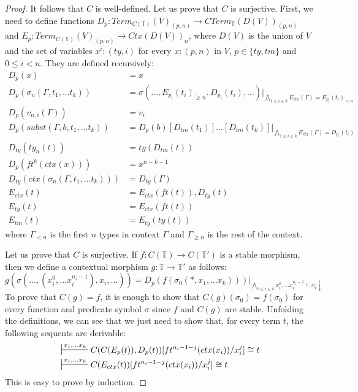 \documentclass[reqno]{amsart}
\theoremstyle{definition}
\theoremstyle{remark}
\newcommand{\emptyCtx}{*}
\numberwithin{figure}{section}
\begin{document}
\begin{proof}
It follows that $C$ is well-defined.
Let us prove that $C$ is surjective.
First, we need to define functions $D_p : Term_{C(\mathbb{T})}(V)_{(p,n)} \to CTerm_\mathbb{T}(D(V))_{(p,n)}$ and $E_p : Term_{C(\mathbb{T})}(V)_{(p,n)} \to Ctx(D(V))_n$,
where $D(V)$ is the union of $V$ and the set of variables $x^i : (ty,i)$ for every $x : (p,n)$ in $V$, $p \in \{ty,tm\}$ and $0 \leq i < n$.
They are defined recursively:
\begin{align*}
D_p(x) & = x \\
D_p(\sigma_n(\Gamma, t_1, \ldots t_k)) & = \sigma(\ldots, E_{p_i}(t_i)_{\geq n}.\,D_{p_i}(t_i), \ldots)|_{\bigwedge_{1 \leq i \leq k} E_{ctx}(\Gamma) = E_{p_i}(t_i)_{<n}} \\
D_p(v_{n,i}(\Gamma)) & = v_i \\
D_p(subst(\Gamma, b, t_1, \ldots t_k)) & = D_p(b)[D_{tm}(t_1)] \ldots [D_{tm}(t_k)]|_{\bigwedge_{1 \leq i \leq k} E_{ctx}(\Gamma) = D_{p_i}(t_i)} \\
D_{ty}(ty_n(t)) & = ty(D_{tm}(t)) \\
D_p(ft^k(ctx(x))) & = x^{n-k-1} \\
D_{ty}(ctx(\sigma_n(\Gamma, t_1, \ldots t_k))) & = D_{ty}(\Gamma) \\
E_{ctx}(t) & = E_{ctx}(ft(t)), D_{ty}(t) \\
E_{ty}(t) & = E_{ctx}(ft(t)) \\
E_{tm}(t) & = E_{ty}(ty(t))
\end{align*}
where $\Gamma_{<n}$ is the first $n$ types in context $\Gamma$ and $\Gamma_{\geq n}$ is the rest of the context.

Let us prove that $C$ is surjective.
If $f : C(\mathbb{T}) \to C(\mathbb{T}')$ is a stable morphism, then we define a contextual morphism $g : \mathbb{T} \to \mathbb{T}'$ as follows:
\[ g(\sigma(\ldots, (x_i^0, \ldots x_i^{n_i-1}).\,x_i, \ldots)) = D_p(f(\sigma_0(\emptyCtx, x_1, \ldots x_k)))|_{\bigwedge_{1 \leq i \leq k} x_i^0, \ldots x_i^{n_i-1} \vdash x_i \downarrow} \]
To prove that $C(g) = f$, it is enough to show that $C(g)(\sigma_0) = f(\sigma_0)$ for every function and predicate symbol $\sigma$ since $f$ and $C(g)$ are stable.
Unfolding the definitions, we can see that we just need to show that, for every term $t$, the following sequents are derivable:
\begin{align*}
& \sststile{}{x_1, \ldots x_k} C(C(E_p(t)), D_p(t))[ft^{n_i-1-j}(ctx(x_i))/x_i^j] \cong t \\
& \sststile{}{x_1, \ldots x_k} C(E_{ctx}(t))[ft^{n_i-1-j}(ctx(x_i))/x_i^j] \cong t
\end{align*}
This is easy to prove by induction.


\end{proof}
\end{document}
